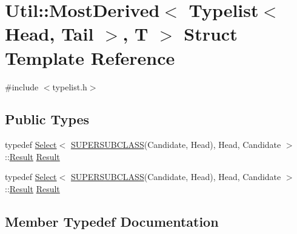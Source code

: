 \hypertarget{structUtil_1_1TL_1_1MostDerived_3_01Typelist_3_01Head_00_01Tail_01_4_00_01T_01_4}{}\section{Util\+:\+:Most\+Derived$<$ Typelist$<$ Head, Tail $>$, T $>$ Struct Template Reference}
\label{structUtil_1_1TL_1_1MostDerived_3_01Typelist_3_01Head_00_01Tail_01_4_00_01T_01_4}


{\ttfamily \#include $<$typelist.\+h$>$}

\subsection*{Public Types}
\begin{DoxyCompactItemize}
\item 
typedef \mbox{\hyperlink{structUtil_1_1Select}{Select}}$<$ \mbox{\hyperlink{install_2include_2adat_2typemanip_8h_a2820bb39352560126da663542139bd9b}{S\+U\+P\+E\+R\+S\+U\+B\+C\+L\+A\+SS}}(Candidate, Head), Head, Candidate $>$\+::\mbox{\hyperlink{structUtil_1_1TL_1_1MostDerived_3_01Typelist_3_01Head_00_01Tail_01_4_00_01T_01_4_a70c1999c1e1c8426f47682c8a0289724}{Result}} \mbox{\hyperlink{structUtil_1_1TL_1_1MostDerived_3_01Typelist_3_01Head_00_01Tail_01_4_00_01T_01_4_a70c1999c1e1c8426f47682c8a0289724}{Result}}
\item 
typedef \mbox{\hyperlink{structUtil_1_1Select}{Select}}$<$ \mbox{\hyperlink{install_2include_2adat_2typemanip_8h_a2820bb39352560126da663542139bd9b}{S\+U\+P\+E\+R\+S\+U\+B\+C\+L\+A\+SS}}(Candidate, Head), Head, Candidate $>$\+::\mbox{\hyperlink{structUtil_1_1TL_1_1MostDerived_3_01Typelist_3_01Head_00_01Tail_01_4_00_01T_01_4_a70c1999c1e1c8426f47682c8a0289724}{Result}} \mbox{\hyperlink{structUtil_1_1TL_1_1MostDerived_3_01Typelist_3_01Head_00_01Tail_01_4_00_01T_01_4_a70c1999c1e1c8426f47682c8a0289724}{Result}}
\end{DoxyCompactItemize}


\subsection{Member Typedef Documentation}
\mbox{\label{structUtil_1_1TL_1_1MostDerived_3_01Typelist_3_01Head_00_01Tail_01_4_00_01T_01_4_a70c1999c1e1c8426f47682c8a0289724}} 

